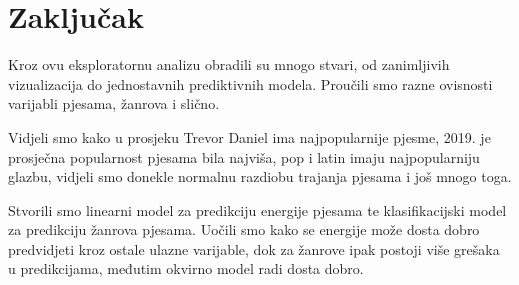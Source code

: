 \chapter{Zaključak}

Kroz ovu eksploratornu analizu obradili su mnogo stvari, od zanimljivih vizualizacija do jednostavnih prediktivnih modela. Proučili smo razne ovisnosti varijabli pjesama, žanrova i slično.
	
Vidjeli smo kako u prosjeku Trevor Daniel ima najpopularnije pjesme, 2019. je prosječna popularnost pjesama bila najviša, pop i latin imaju najpopularniju glazbu, vidjeli smo donekle normalnu razdiobu trajanja pjesama i još mnogo toga.

 Stvorili smo linearni model za predikciju energije pjesama te klasifikacijski model za predikciju žanrova pjesama. Uočili smo kako se energije može dosta dobro predvidjeti kroz ostale ulazne varijable, dok za žanrove ipak postoji više grešaka u predikcijama, međutim okvirno model radi dosta dobro.

\eject



